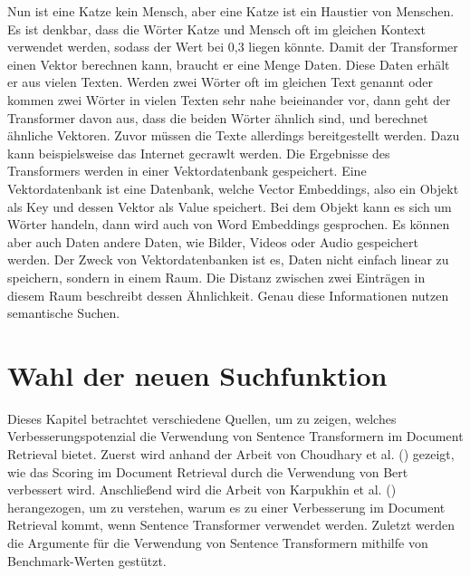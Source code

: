 Nun ist eine Katze kein Mensch, aber eine Katze ist ein Haustier von Menschen.
Es ist denkbar, dass die Wörter Katze und Mensch oft im gleichen Kontext verwendet werden, sodass der Wert bei 0,3 liegen könnte.
Damit der Transformer einen Vektor berechnen kann, braucht er eine Menge Daten.
Diese Daten erhält er aus vielen Texten.
Werden zwei Wörter oft im gleichen Text genannt oder kommen zwei Wörter in vielen Texten sehr nahe beieinander vor, dann geht der Transformer davon aus, dass die beiden Wörter ähnlich sind, und berechnet ähnliche Vektoren.
Zuvor müssen die Texte allerdings bereitgestellt werden.
Dazu kann beispielsweise das Internet gecrawlt werden.
Die Ergebnisse des Transformers werden in einer Vektordatenbank gespeichert.
Eine Vektordatenbank ist eine Datenbank, welche Vector Embeddings, also ein Objekt als Key und dessen Vektor als Value speichert.
Bei dem Objekt kann es sich um Wörter handeln, dann wird auch von Word Embeddings gesprochen.
Es können aber auch Daten andere Daten, wie Bilder, Videos oder Audio gespeichert werden.
Der Zweck von Vektordatenbanken ist es, Daten nicht einfach linear zu speichern, sondern in einem Raum.
Die Distanz zwischen zwei Einträgen in diesem Raum beschreibt dessen Ähnlichkeit.
Genau diese Informationen nutzen semantische Suchen.

\section{Wahl der neuen Suchfunktion}
Dieses Kapitel betrachtet verschiedene Quellen, um zu zeigen, welches Verbesserungspotenzial die Verwendung von Sentence Transformern im Document Retrieval bietet.
Zuerst wird anhand der Arbeit von Choudhary et al. (\citeyear{Choudhary_Guttikonda_Chowdhury_Learmonth_2020}) gezeigt, wie das Scoring im Document Retrieval durch die Verwendung von Bert verbessert wird.
Anschließend wird die Arbeit von Karpukhin et al. (\citeyear{Karpukhin_Oguz_Min_Lewis_Wu_Edunov_Chen_Yih_2020}) herangezogen, um zu verstehen, warum es zu einer Verbesserung im Document Retrieval kommt, wenn Sentence Transformer verwendet werden.
Zuletzt werden die Argumente für die Verwendung von Sentence Transformern mithilfe von Benchmark-Werten gestützt.\\

